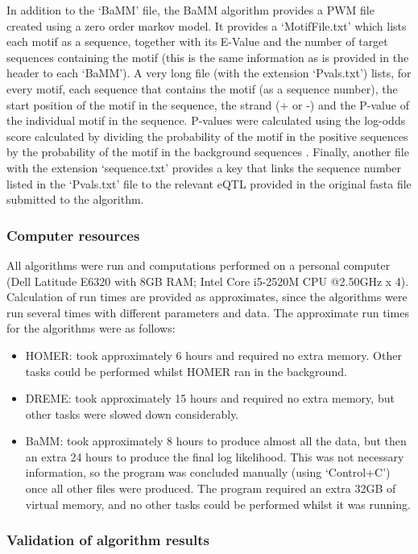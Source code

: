 \documentclass[12pt]{article}
\begin{document}
In addition to the `BaMM' file, the BaMM algorithm provides a PWM file created using a zero order markov model. It provides a `MotifFile.txt' which lists each motif as a sequence, together with its E-Value and the number of target sequences containing the motif (this is the same information as is provided in the header to each `BaMM'). A very long file (with the extension `Pvals.txt') lists, for every motif, each sequence that contains the motif (as a sequence number), the start position of the motif in the sequence, the strand (+ or -) and the P-value of the individual motif in the sequence. P-values were calculated using the log-odds score calculated by dividing the probability of the motif in the positive sequences by the probability of the motif in the background sequences \citep{siebert2016bayesian}. Finally, another file with the extension `sequence.txt' provides a key that links the sequence number listed in the `Pvals.txt' file to the relevant eQTL provided in the original fasta file submitted to the algorithm. 

\subsubsection{Computer resources}

All algorithms were run and computations performed on a personal computer (Dell Latitude E6320 with 8GB RAM; Intel Core i5-2520M CPU @2.50GHz x 4). Calculation of run times are provided as approximates, since the algorithms were run several times with different parameters and data. The approximate run times for the algorithms were as follows:
\begin{itemize}
\item HOMER: took approximately 6 hours and required no extra memory. Other tasks could be performed whilst HOMER ran in the background.
\item DREME: took approximately 15 hours and required no extra memory, but other tasks were slowed down considerably.
\item BaMM: took approximately 8 hours to produce almost all the data, but then an extra 24 hours to produce the final log likelihood. This was not necessary information, so the program was concluded manually (using `Control+C') once all other files were produced. The program required an extra 32GB of virtual memory, and no other tasks could be performed whilst it was running.
\end{itemize}


\subsubsection{Validation of algorithm results}
\end{document}

